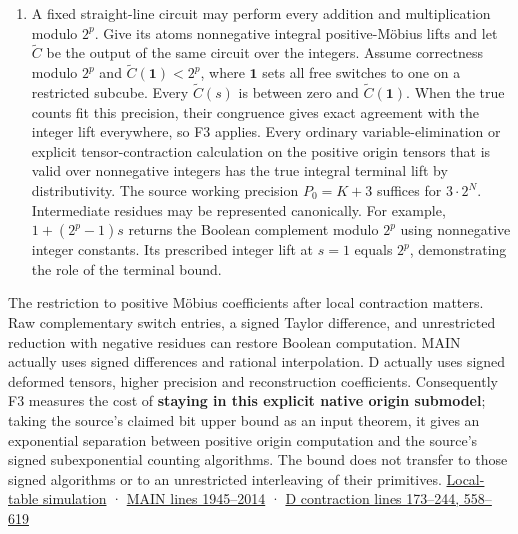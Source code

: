 \documentclass[
  11pt,
]{article}
\begin{document}
\begin{enumerate}
  executed arithmetic is one correct positive DAG, including distinct
  producers for reused values. Each incoming cache entry must satisfy
  the atom hypothesis or have a charged positive producer DAG valid on
  the same subcube, with the relevant producer control choices covered
  as well. If \(|Q|\le\beta N\), F3 requires \(2^{cN}\) distinct gates
  in the resulting DAG. An execution with fewer gates therefore has no
  such certificate on \(\beta N\) or fewer coordinates, independently of
  the number of plans. This is a dependence statement. One global oracle
  test may have footprint \(N\) in one call. A bound on literal reads
  requires an access model that charges those reads.
\item
  A fixed straight-line circuit may perform every addition and
  multiplication modulo \(2^p\). Give its atoms nonnegative integral
  positive-Möbius lifts and let \(\widetilde C\) be the output of the
  same circuit over the integers. Assume correctness modulo \(2^p\) and
  \(\widetilde C(\mathbf1)<2^p\), where \(\mathbf1\) sets all free
  switches to one on a restricted subcube. Every \(\widetilde C(s)\) is
  between zero and \(\widetilde C(\mathbf1)\). When the true counts fit
  this precision, their congruence gives exact agreement with the
  integer lift everywhere, so F3 applies. Every ordinary
  variable-elimination or explicit tensor-contraction calculation on the
  positive origin tensors that is valid over nonnegative integers has
  the true integral terminal lift by distributivity. The source working
  precision \(P_0=K+3\) suffices for \(3\cdot2^N\). Intermediate
  residues may be represented canonically. For example, \(1+(2^p-1)s\)
  returns the Boolean complement modulo \(2^p\) using nonnegative
  integer constants. Its prescribed integer lift at \(s=1\) equals
  \(2^p\), demonstrating the role of the terminal bound.
\end{enumerate}

The restriction to positive Möbius coefficients after local contraction
matters. Raw complementary switch entries, a signed Taylor difference,
and unrestricted reduction with negative residues can restore Boolean
computation. MAIN actually uses signed differences and rational
interpolation. D actually uses signed deformed tensors, higher precision
and reconstruction coefficients. Consequently F3 measures the cost of
\textbf{staying in this explicit native origin submodel}; taking the
source's claimed bit upper bound as an input theorem, it gives an
exponential separation between positive origin computation and the
source's signed subexponential counting algorithms. The bound does not
transfer to those signed algorithms or to an unrestricted interleaving
of their primitives. \hyperref[v8-section-native-closure]{Local-table
simulation} ·
\href{https://github.com/openai/math/blob/main/preprints/The-Exponential-Time-Hypothesis-is-False-October-25-2026/build/main_full_version.tex\#L1945}{MAIN
lines 1945--2014} ·
\href{https://github.com/openai/math/blob/main/preprints/The-Exponential-Time-Hypothesis-is-False-October-25-2026/build/quantitative-contraction.tex\#L173}{D
contraction lines 173--244, 558--619}
\end{document}
